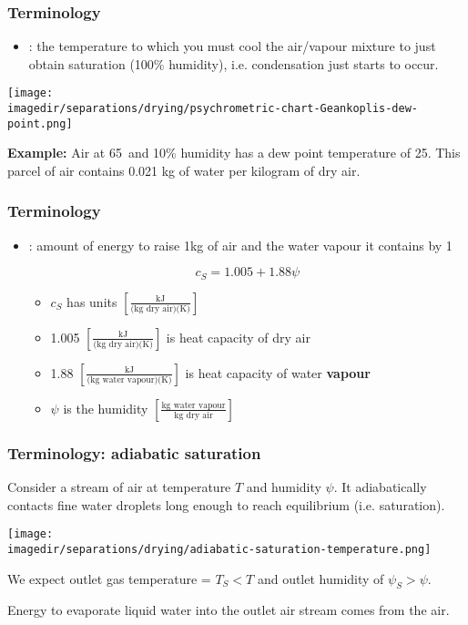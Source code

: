 \begin{frame}\frametitle{Terminology}
	\begin{itemize}
		\item	{\color{purple}{Dew point}}: the temperature to which you must cool the air/vapour mixture to just obtain saturation (100\% humidity), i.e. condensation just starts to occur.
	\end{itemize}
	\begin{center}
		\texttt{[image: \\imagedir/separations/drying/psychrometric-chart-Geankoplis-dew-point.png]}
	\end{center}

	\textbf{Example:} Air at 65\degC$\,$ and 10\% humidity has a dew point temperature of 25\degC. This parcel of air contains 0.021 kg of water per kilogram of dry air.
\end{frame}

\begin{frame}\frametitle{Terminology}
	\begin{itemize}
		\item	 {\color{purple}{Humid heat}}: amount of energy to raise 1kg of air and the water vapour it contains by 1\degC

		\begin{exampleblock}{}
			\[c_S = 1.005 + 1.88\psi\]
		\end{exampleblock}
		\begin{itemize}
			\item	$c_S$ has units $\left[\displaystyle \frac{\text{kJ}}{\text{(kg dry air)(K)}} \right]$
			\item	1.005 $\left[\displaystyle \frac{\text{kJ}}{\text{(kg dry air)(K)}} \right]$ is heat capacity of dry air
			\item	1.88 $\left[\displaystyle \frac{\text{kJ}}{\text{(kg water vapour)(K)}} \right]$ is heat capacity of water \textbf{vapour}
			\item	$\psi$ is the humidity $ \left[ \displaystyle \frac{\text{kg water vapour}}{\text{kg dry air}}\right]$
		\end{itemize}
	\end{itemize}
\end{frame}

\begin{frame}\frametitle{Terminology: adiabatic saturation}
	Consider a stream of air at temperature $T$ and humidity $\psi$. It adiabatically contacts fine water droplets long enough to reach equilibrium (i.e. saturation).

	\begin{center}
		\texttt{[image: \\imagedir/separations/drying/adiabatic-saturation-temperature.png]}
	\end{center}

	We expect outlet gas temperature = $T_S < T$ and outlet humidity of $\psi_S > \psi$.

	\vspace{2pt}
	Energy to evaporate liquid water into the outlet air stream comes from the air.
\end{frame}

